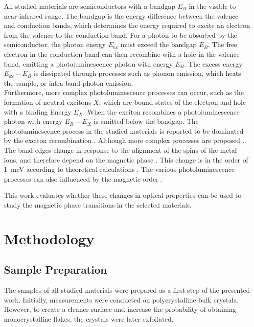 \documentclass[
	twoside,
	parskip=half,
	a4paper,
]{scrbook}
\begin{document}
All studied materials are semiconductors with a bandgap $E_B$ in the visible to near-infrared range.
The bandgap is the energy difference between the valence and conduction bands, which determines the energy required to excite an electron from the valence to the conduction band.
For a photon to be absorbed by the semiconductor, the photon energy $E_\text{ex}$ must exceed the bandgap $E_B$.
The free electron in the conduction band can then recombine with a hole in the valence band, emitting a photoluminescence photon with energy $E_B$.
The excess energy $E_\text{ex} - E_B$ is dissipated through processes such as phonon emission, which heats the sample, or intra-band photon emission.\\
Furthermore, more complex photoluminescence processes can occur, such as the formation of neutral excitons $X$, which are bound states of the electron and hole with a binding Energy $E_X$.
When the exciton recombines a photoluminescence photon with energy $E_B - E_X$ is emitted below the bandgap.
The photoluminescence process in the studied materials is reported to be dominated by the exciton recombination \cite{NiPS3_exciton,MPX_first_principles,NiPS3_anisotropic}.
Although more complex processes are proposed \cite{NiPS3_coherent}.
The band edges change in response to the alignment of the spins of the metal ions, and therefore depend on the magnetic phase \cite{MPX_first_principles}.
This change is in the order of \SI{1}{meV} according to theoretical calculations \cite{MPX_first_principles}.
The various photoluminescence processes can also influenced by the magnetic order \cite{NiPS3_linear}.

This work evaluates whether these changes in optical properties can be used to study the magnetic phase transitions in the selected materials.


\chapter{Methodology}
\section{Sample Preparation}
The samples of all studied materials were prepared as a first step of the presented work.
Initially, measurements were conducted on polycrystalline bulk crystals.
However, to create a cleaner surface and increase the probability of obtaining monocrystalline flakes, the crystals were later exfoliated.
\end{document}
